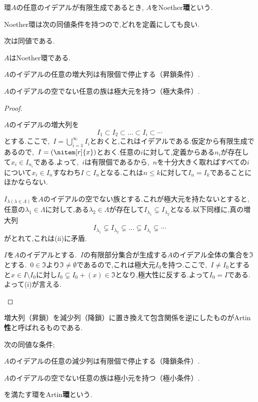 \begin{defi}[Noether環]
		環$A$の任意のイデアルが有限生成であるとき, $A$をNoether\textbf{環}という.
\end{defi}
	
Noether環は次の同値条件を持つので,どれを定義にしても良い.

\begin{prop}
	次は同値である.
	\begin{sakura}
		\item $A$はNoether環である.
		\item $A$のイデアルの任意の増大列は有限個で停止する（昇鎖条件）.
		\item $A$のイデアルの空でない任意の族は極大元を持つ（極大条件）.
	\end{sakura}
\end{prop}
	
\begin{proof}
	\begin{eqv}[3]
		\item 
		$A$のイデアルの増大列を
		\[I_1\subset I_2\subset\dots\subset I_i\subset\cdots\]
		とする.ここで,~$I=\bigcup_{i=1}^\infty I_i$とおくと,これはイデアルである.仮定から有限生成であるので,~$I=(\nitem[r]{x})$とおく.任意の$i$に対して,定義からある$n_i$が存在して$x_i\in I_{n_i}$である.よって,~$i$は有限個であるから,~$n$を十分大きく取ればすべての$i$について$x_i\in I_n$すなわち$I\subset I_{n}$となる.これは$n\leq k$に対して$I_{n}=I_k$であることにほかならない.
		\item
		$I_{\lambda(\lambda\in\Lambda)}$を$A$のイデアルの空でない族とする.これが極大元を持たないとすると,任意の$\lambda_1\in\Lambda$に対して,ある$\lambda_2\in\Lambda$が存在して$I_{\lambda_1}\subsetneq I_{\lambda_2}$となる.以下同様に,真の増大列
		\[I_{\lambda_1}\subsetneq I_{\lambda_2}\subsetneq\dots\subsetneq I_{\lambda_i}\subsetneq\cdots\]
		がとれて,これは(ii)に矛盾.
		\item 
		$I$を$A$のイデアルとする.~$I$の有限部分集合が生成する$A$のイデアル全体の集合を$\Im$とする.~$0\in\Im$より$\Im\neq\emptyset$であるので,これは極大元$I_0$を持つ.ここで,~$I\neq I_0$とすると$x\in I\setminus I_0$に対し$I_0\subsetneq I_0+(x)\in\Im$となり,極大性に反する.よって$I_0=I$である.よって(i)が言える.
	\end{eqv}
\end{proof}

増大列（昇鎖）を減少列（降鎖）に置き換えて包含関係を逆にしたものがArtin\textbf{性}と呼ばれるものである.

\begin{defi}[Artin環]
	次の同値な条件;
	\begin{sakura}
		\item  $A$のイデアルの任意の減少列は有限個で停止する（降鎖条件）.
		\item $A$のイデアルの空でない任意の族は極小元を持つ（極小条件）.
	\end{sakura}
	を満たす環をArtin\textbf{環}という.
\end{defi}

